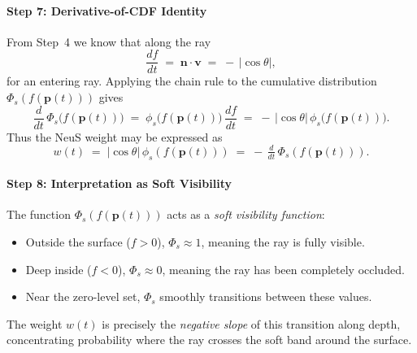 \begin{enrichment}
\begin{enrichment}
        \paragraph{Step 7: Derivative-of-CDF Identity}
        From Step~4 we know that along the ray
        \[
        \frac{df}{dt} \;=\; \mathbf{n}\!\cdot\!\mathbf{v} \;=\; -\,|\cos\theta|,
        \]
        for an entering ray. Applying the chain rule to the cumulative distribution
        \(\Phi_s(f(\mathbf{p}(t)))\) gives
        \begin{equation}
            \frac{d}{dt}\,\Phi_s\!\big(f(\mathbf{p}(t))\big)
            \;=\;
            \phi_s\!\big(f(\mathbf{p}(t))\big)\,\frac{df}{dt}
            \;=\;
            -\,|\cos\theta|\,\phi_s\!\big(f(\mathbf{p}(t))\big).
        \end{equation}
        Thus the NeuS weight may be expressed as
        \begin{equation}
            \boxed{\,w(t) \;=\; |\cos\theta|\,\phi_s(f(\mathbf{p}(t))) \;=\; -\,\tfrac{d}{dt}\,\Phi_s(f(\mathbf{p}(t))).\,}
        \end{equation}
        
        \paragraph{Step 8: Interpretation as Soft Visibility}
        The function \(\Phi_s(f(\mathbf{p}(t)))\) acts as a \emph{soft visibility function}: 
        \begin{itemize}
            \item Outside the surface (\(f>0\)), \(\Phi_s \approx 1\), meaning the ray is fully visible.  
            \item Deep inside (\(f<0\)), \(\Phi_s \approx 0\), meaning the ray has been completely occluded.  
            \item Near the zero-level set, \(\Phi_s\) smoothly transitions between these values.
        \end{itemize}
        The weight \(w(t)\) is precisely the \emph{negative slope} of this transition along depth, concentrating probability where the ray crosses the soft band around the surface.
        

\end{enrichment}
\end{enrichment}
